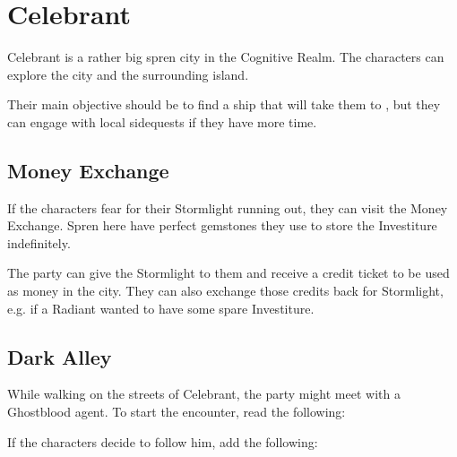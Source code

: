 \section{Celebrant}
\label{sec:celebrant}

Celebrant is a rather big spren city in the Cognitive Realm. The characters can explore the city and the surrounding island. 

Their main objective should be to find a ship that will take them to \locationFidelity{}, but they can engage with local sidequests if they have more time.


\subsection{Money Exchange}

If the characters fear for their Stormlight running out, they can visit the Money Exchange. Spren here have perfect gemstones they use to store the Investiture indefinitely. 

The party can give the Stormlight to them and receive a credit ticket to be used as money in the city. They can also exchange those credits back for Stormlight, e.g. if a Radiant wanted to have some spare Investiture.




\subsection{Dark Alley}
\label{ssec:celebrantAlley}

While walking on the streets of Celebrant, the party might meet with a Ghostblood agent. To start the encounter, read the following:


If the characters decide to follow him, add the following:


